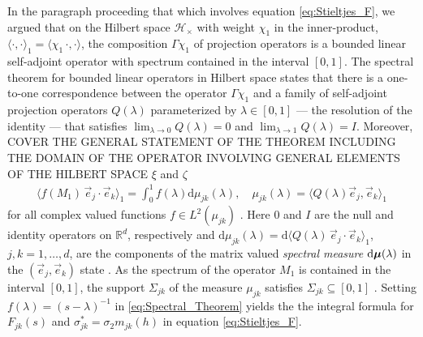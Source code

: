 \documentclass{cmslatex}
\renewcommand{\d}{\text{d}}
\newcommand\bmu{\mbox{\boldmath${\mu}$}}
\begin{document}
In the paragraph proceeding that which involves equation
\eqref{eq:Stieltjes_F}, we argued that on the Hilbert space
$\mathscr{H}_\times$ with weight $\chi_1$ in the inner-product,
$\langle\cdot,\cdot\rangle_1=\langle\chi_1\,\cdot,\cdot\rangle$, the composition $\Gamma\chi_1$ of projection operators
is a bounded linear self-adjoint operator with spectrum contained in
the interval $[0,1]$. The spectral theorem for bounded linear
operators in Hilbert space \cite{Stone:64} states that there is a
one-to-one correspondence between the operator $\Gamma\chi_1$ and a family of
self-adjoint projection operators $Q(\lambda)$ parameterized by $\lambda\in[0,1]$
--- the resolution of the identity --- that satisfies
$\lim_{\lambda\to0}Q(\lambda)=0$ and $\lim_{\lambda\to1}Q(\lambda)=I$. Moreover,
COVER THE GENERAL STATEMENT OF THE THEOREM INCLUDING THE DOMAIN OF THE OPERATOR
INVOLVING GENERAL ELEMENTS OF THE HILBERT SPACE $\xi$ and $\zeta$
% 
\begin{align}\label{eq:Spectral_Theorem}  
  \langle f(M_1)\,\vec{e}_j\cdot\vec{e}_k\rangle_1= \int_0^1f(\lambda)\d\mu_{jk}(\lambda), \quad
  \mu_{jk}(\lambda)=\langle Q(\lambda)\vec{e}_j,\vec{e}_k\rangle_1
\end{align}
%
for all complex valued functions $f\in L^2(\mu_{jk})$ \cite{Stone:64}. Here
$0$ and $I$ are the null and identity operators on $\mathbb{R}^d$,
respectively and $\d\mu_{jk}(\lambda)=\d\langle Q(\lambda)\,\vec{e}_j\cdot\vec{e}_k\rangle_1$,
$j,k=1,\ldots,d$, are the components of the matrix valued \emph{spectral
  measure} $\d\bmu(\lambda)$ in the $(\vec{e}_j,\vec{e}_k)$ state
\cite{Golden:CMP-473,Reed-1980,Stone:64}. As the spectrum of the 
operator $M_1$ is contained in the interval $[0,1]$, the support
$\Sigma_{jk}$ of the measure $\mu_{jk}$ satisfies $\Sigma_{jk}\subseteq[0,1]$
\cite{Reed-1980}. Setting $f(\lambda)=(s-\lambda)^{-1}$ in
\eqref{eq:Spectral_Theorem} yields the the integral formula for 
$F_{jk}(s)$ and $\sigma_{jk}^*=\sigma_2m_{jk}(h)$ in equation \eqref{eq:Stieltjes_F}.
\end{document}
